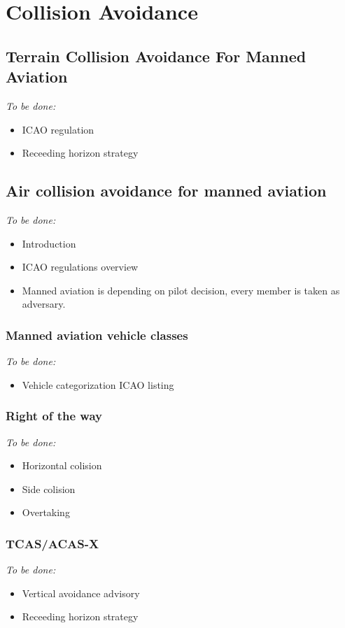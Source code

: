 \chapter{Collision Avoidance}\label{ch:collisionAvoidance}

\section{Terrain Collision Avoidance For Manned Aviation}
    \emph{To be done:}
    \begin{itemize}
        \item ICAO regulation 
        \item Receeding horizon strategy
    \end{itemize} 

\section{Air collision avoidance for manned aviation}
    \emph{To be done:}
    \begin{itemize}
        \item Introduction
        \item ICAO regulations overview
        \item Manned aviation is depending on pilot decision, every member is taken as adversary.
    \end{itemize} 
    
\subsection{Manned aviation vehicle classes}
    \emph{To be done:}
    \begin{itemize}
        \item Vehicle categorization ICAO listing 
    \end{itemize} 
    
\subsection{Right of the way}
    \emph{To be done:}
    \begin{itemize}
        \item Horizontal colision
        \item Side colision
        \item Overtaking
    \end{itemize} 
    
\subsection{TCAS/ACAS-X}
    \emph{To be done:}
    \begin{itemize}
        \item Vertical avoidance advisory
        \item Receeding horizon strategy
    \end{itemize} 

